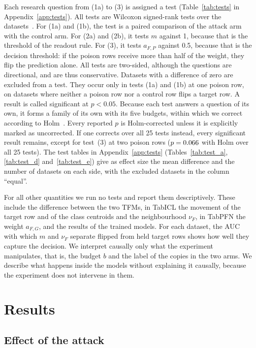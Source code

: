 \documentclass[pdflatex,sn-mathphys-num]{sn-jnl}
\begin{document}
Each research question from (1a) to (3) is assigned a test
(Table~\ref{tab:tests} in Appendix~\ref{app:tests}). All tests are
Wilcoxon signed-rank tests over the datasets~\citep{demsar2006}. For
(1a) and (1b), the test is a paired comparison of the attack arm with
the control arm. For (2a) and (2b), it tests $m$ against 1, because that is the
threshold of the readout rule. For (3), it tests $a_{F,P}$ against 0.5, because that is the
decision threshold: if the poison rows receive more than half of the
weight, they flip the prediction alone. All tests are two-sided, although the
questions are directional, and are thus conservative. Datasets with a
difference of zero are excluded from a test. They occur only in tests
(1a) and (1b) at one poison row, on datasets where neither a poison row
nor a control row flips a target row. A result is called significant at
$p < 0.05$. Because each test answers a question of its own, it forms a
family of its own with its five budgets, within which we correct
according to Holm~\citep{demsar2006}. Every reported $p$ is
Holm-corrected unless it is explicitly marked as uncorrected. If one
corrects over all 25 tests instead, every significant result remains,
except for test~(3) at two poison rows
($p = 0.066$ with Holm over all 25 tests). The
test tables in Appendix~\ref{app:tests} (Tables~\ref{tab:test_a},
\ref{tab:test_d} and~\ref{tab:test_e}) give as effect size the mean
difference and the number of datasets on each side, with the excluded
datasets in the column \enquote{equal}.

For all other quantities we run no tests and report them descriptively.
These include the difference between the two TFMs, in TabICL the
movement of the target row and of the class centroids and the
neighbourhood $\nu_F$, in TabPFN the weight $a_{F,G}$, and the results
of the trained models. For each dataset, the AUC with which $m$ and
$\nu_F$ separate flipped from held target rows shows how well they
capture the decision. We interpret causally only what the experiment
manipulates, that is, the budget $b$ and the label of the copies in the
two arms. We describe what happens inside the models without explaining
it causally, because the experiment does not intervene in them.

\section{Results}
\label{sec:ergebnisse}

\subsection{Effect of the attack}
\label{sec:budget}
\end{document}
